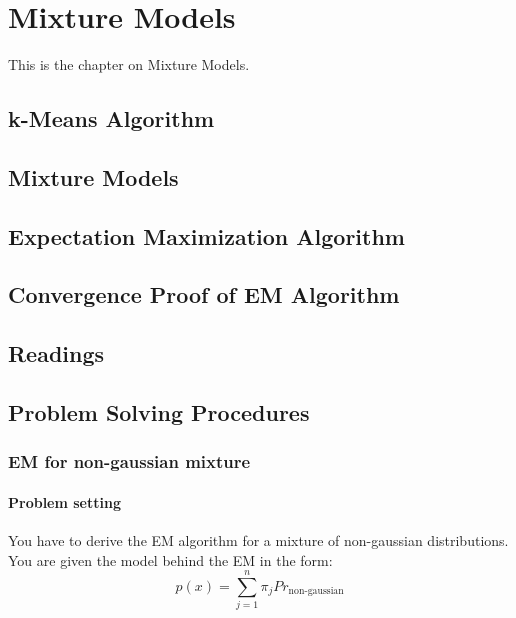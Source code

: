\documentclass[main]{subfiles}
\begin{document}

\section{Mixture Models}
This is the chapter on Mixture Models.
\subsection{k-Means Algorithm}
\subsection{Mixture Models}
\subsection{Expectation Maximization Algorithm}
\subsection{Convergence Proof of EM Algorithm}

\subsection{Readings}

\subsection{Problem Solving Procedures}

\subsubsection{EM for non-gaussian mixture}
\paragraph{Problem setting}
You have to derive the EM algorithm for a mixture of non-gaussian distributions.
You are given the model behind the EM in the form:
\[p(x) = \sum\limits^n_{j=1}\pi_j Pr_{\text{non-gaussian}}\]
\end{document}
